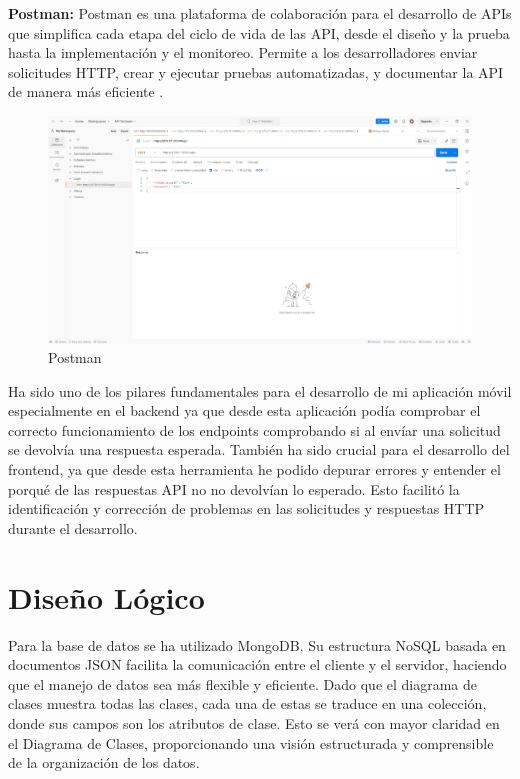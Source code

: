 \textbf{Postman:}  Postman es una plataforma de colaboración para el desarrollo de APIs que simplifica cada etapa del ciclo de vida de las API, desde el diseño y la prueba hasta la implementación y el monitoreo. Permite a los desarrolladores enviar solicitudes HTTP, crear y ejecutar pruebas automatizadas, y documentar la API de manera más eficiente \cite{postman}.

\begin{figure}[H]
    \centering
    \includegraphics[width=1.0\textwidth]{imagenes/Postman.png}
    \caption{Postman}
    \label{fig:postman}
\end{figure}

Ha sido uno de los pilares fundamentales para el desarrollo de mi aplicación móvil especialmente en el backend ya que desde esta aplicación podía comprobar el correcto funcionamiento de los endpoints comprobando si al envíar una solicitud se devolvía una respuesta esperada. También ha sido crucial para el desarrollo del frontend, ya que desde esta herramienta he podido depurar errores y entender el porqué de las respuestas API no no devolvían lo esperado. Esto facilitó la identificación y corrección de problemas en las solicitudes y respuestas HTTP durante el desarrollo.

\section{Diseño Lógico}

Para la base de datos se ha utilizado MongoDB. Su estructura NoSQL basada en documentos JSON facilita la comunicación entre el cliente y el servidor, haciendo que el manejo de datos sea más flexible y eficiente. Dado que el diagrama de clases muestra todas las clases, cada una de estas se traduce en una colección, donde sus campos son los atributos de clase. Esto se verá con mayor claridad en el Diagrama de Clases, proporcionando una visión estructurada y comprensible de la organización de los datos.


